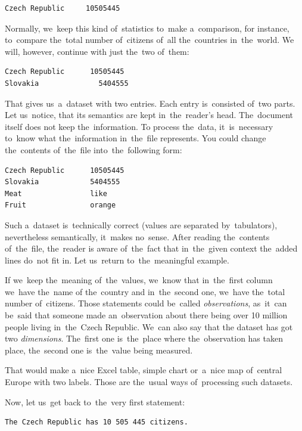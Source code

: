 \begin{verbatim}
Czech Republic     10505445
\end{verbatim}

Normally, we~keep this kind of~statistics to~make a~comparison, 
for instance, to~compare the~total number of~citizens of~all the~countries in~the~world.
We will, however, continue with just the~two of~them:

\begin{verbatim}
Czech Republic	    10505445
Slovakia	          5404555
\end{verbatim}

That gives us~a~dataset with two entries. Each entry is~consisted of~two parts. Let us~notice, that 
its semantics are kept in~the~reader's head. The~document itself does not keep the~information.
To process the~data, it~is~necessary to~know what the~information in~the~file represents. You could change
the~contents of~the~file into~the~following form:

\begin{verbatim}
Czech Republic      10505445
Slovakia            5404555
Meat                like
Fruit               orange
\end{verbatim}

Such a~dataset is~technically correct (values are separated by~tabulators), nevertheless 
semantically, it~makes no~sense. After reading the~contents of~the~file, the~reader 
is aware of~the~fact that in~the~given context the~added lines do~not fit in.
Let us~return to~the~meaningful example.

If we~keep the~meaning of~the~values, we~know that in~the~first column we~have the~name
of the~country and in~the~second one, we~have the~total number of~citizens. Those statements
could be~called \emph{observations}, as~it~can be~said that someone made an~observation 
about there being over 10 million people living in~the~Czech Republic. We~can also say that the
dataset has got two \emph{dimensions}. The~first one is~the~place where the~observation has taken
place, the~second one is~the~value being measured.

That would make a~nice Excel table, simple chart or~a~nice map of~central Europe with
two labels. Those are the~usual ways of~processing such datasets.

Now, let us~get back to~the~very first statement:

\begin{verbatim}
The Czech Republic has 10 505 445 citizens.
\end{verbatim}

